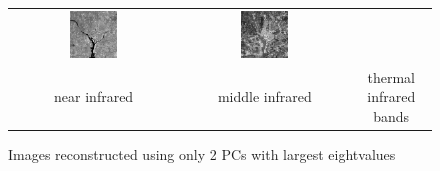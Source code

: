 \documentclass[11pt,a4paper]{article}
\begin{document}
\begin{figure}[!htbp]
\begin{tabular}{ccc}
		\includegraphics[width=0.3\textwidth]{pro10/PC/11_41_e}&
		\includegraphics[width=0.3\textwidth]{pro10/PC/11_41_f}\\
		near infrared & middle infrared& thermal infrared bands
	\end{tabular}
	\caption{Images reconstructed using only 2 PCs with largest eightvalues}
	\label{pro10_fig4}
\end{figure}
\end{document}
